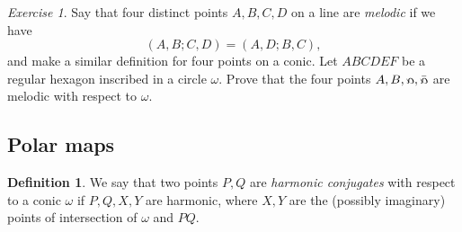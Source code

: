 \documentclass[letterpaper,11pt]{article}
\theoremstyle{definition}
\newtheorem{defn}{Definition}
\theoremstyle{remark}
\newtheorem{exer}{Exercise}
\begin{document}
\begin{exer} Say that four distinct points $A,B,C,D$ on a line are \emph{melodic} if we have
\[
(A,B;C,D) = (A,D;B,C),
\]
and make a similar definition for four points on a conic. Let $ABCDEF$ be a regular hexagon inscribed in a circle $\omega$. Prove that the four points $A,B,\fish,\bar\fish$ are melodic with respect to $\omega$.
\end{exer}


\subsection{Polar maps}

\begin{defn} We say that two points $P,Q$ are \emph{harmonic conjugates} with respect to a conic $\omega$ if $P,Q,X,Y$ are harmonic, where $X,Y$ are the (possibly imaginary) points of intersection of $\omega$ and $PQ$.
\end{defn}
\end{document}
